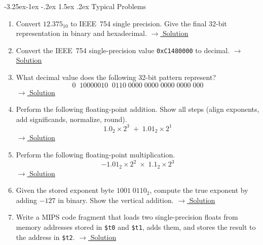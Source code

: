 \documentclass{article}
\makeatletter
\theoremstyle{remark}
\newlength{\subsecindent}
\renewcommand\subsection{\@startsection{subsection}{2}{\subsecindent}%
  {-3.25ex\@plus -1ex \@minus -.2ex}%
  {1.5ex \@plus .2ex}%
  {\normalfont\large\bfseries}}
\newenvironment{sub}{%
  \begin{list}{}{%
    \setlength{\leftmargin}{4em}%
    \setlength{\rightmargin}{0pt}%
    \setlength{\topsep}{0pt}%
    \setlength{\partopsep}{0pt}%
    \setlength{\parsep}{\parskip}%
    \setlength{\itemsep}{\parskip}%
  }\item\relax
}{\end{list}}
\makeatother
\begin{document}
\subsection{Typical Problems}
\begin{sub}
\begin{enumerate}
  \item Convert $12.375_{10}$ to IEEE~754 single precision.  Give the final
        32-bit representation in binary and hexadecimal.
        \hfill\hyperref[sol:1]{$\to$ Solution}

  \item Convert the IEEE~754 single-precision value
        \texttt{0xC1480000} to decimal.
        \hfill\hyperref[sol:2]{$\to$ Solution}

  \item What decimal value does the following 32-bit pattern represent?
        \[
          0\;\;10000010\;\;0110\;0000\;0000\;0000\;0000\;000
        \]
        \hfill\hyperref[sol:3]{$\to$ Solution}

  \item Perform the following floating-point addition.  Show all steps
        (align exponents, add significands, normalize, round).
        \[
          1.0_2 \times 2^{3} \;+\; 1.01_2 \times 2^{1}
        \]
        \hfill\hyperref[sol:4]{$\to$ Solution}

  \item Perform the following floating-point multiplication.
        \[
          -1.01_2 \times 2^{2} \;\times\; 1.1_2 \times 2^{3}
        \]
        \hfill\hyperref[sol:5]{$\to$ Solution}

  \item Given the stored exponent byte $1001\;0110_2$, compute the true
        exponent by adding $-127$ in binary.  Show the vertical addition.
        \hfill\hyperref[sol:6]{$\to$ Solution}

  \item Write a MIPS code fragment that loads two single-precision floats from
        memory addresses stored in \texttt{\$t0} and \texttt{\$t1}, adds them,
        and stores the result to the address in \texttt{\$t2}.
        \hfill\hyperref[sol:7]{$\to$ Solution}
\end{enumerate}
\end{sub}
\end{document}
